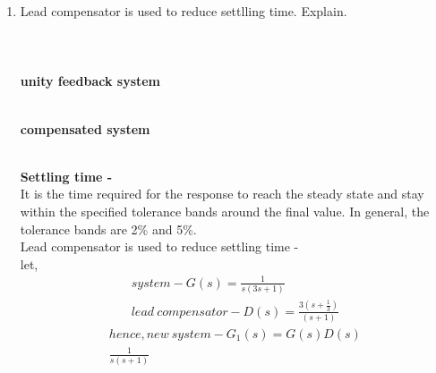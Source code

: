 \begin{enumerate}[label=\thesection.\arabic*.,ref=\thesection.\theenumi]
\item Lead compensator is used to reduce settlling time. Explain.\\
\\
\solution 
\\
\\
\textbf{unity feedback system}
\begin{figure}[h]
\begin{center}
\resizebox{\columnwidth}{!}{}
\end{center}
\end{figure}\\


 \textbf{compensated system}
\begin{figure}[h]
\begin{center}
\resizebox{\columnwidth}{!}{}
\end{center}
\end{figure}\\
\textbf{Settling time - }\\
It is the time required for the response to reach the steady state and stay within the specified tolerance bands around the final value. In general, the tolerance bands are 2\% and 5\%.
\\
Lead compensator is used to reduce settling time - \\

let,\\
\begin{align}
system-G(s) = \frac{1}{s(3s+1)}\\
lead\ compensator-D(s) = \frac{3(s+\frac{1}{3})}{(s+1)}
\end{align}
\begin{equation}
    \begin{split}
        hence, new\ system-G_{1}(s) = G(s)D(s)\\
        \frac{1}{s(s+1)}
    \end{split}
\end{equation}


\\


\end{enumerate}
